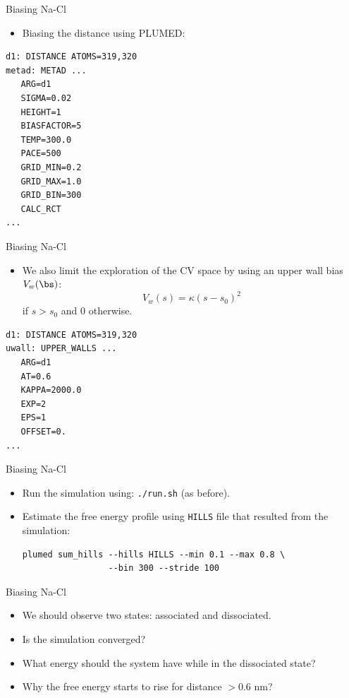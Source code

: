 \documentclass[10pt]{beamer}
\begin{document}
\begin{frame}[fragile]{Biasing Na-Cl}
\begin{itemize}
\setlength\itemsep{1em}
  \item Biasing the distance using PLUMED:
\end{itemize}
\begin{lstlisting}
d1: DISTANCE ATOMS=319,320
metad: METAD ...
   ARG=d1
   SIGMA=0.02
   HEIGHT=1
   BIASFACTOR=5
   TEMP=300.0
   PACE=500
   GRID_MIN=0.2
   GRID_MAX=1.0
   GRID_BIN=300
   CALC_RCT
...
\end{lstlisting}
\end{frame}

\begin{frame}[fragile]{Biasing Na-Cl}
\begin{itemize}
\setlength\itemsep{1em}
  \item We also limit the exploration of the CV space by using an upper wall bias $V_w(\bs)$:
  \begin{equation}
    V_w(s)=\kappa(s-s_0)^2
  \end{equation}
  if $s>s_0$ and 0 otherwise.
\end{itemize}
\begin{lstlisting}
d1: DISTANCE ATOMS=319,320
uwall: UPPER_WALLS ...
   ARG=d1
   AT=0.6
   KAPPA=2000.0
   EXP=2
   EPS=1
   OFFSET=0.
...
\end{lstlisting}
\end{frame}

\begin{frame}[fragile]{Biasing Na-Cl}
\begin{itemize}
\setlength\itemsep{1em}
  \item Run the simulation using: \texttt{./run.sh} (as before).
  \item Estimate the free energy profile using \texttt{HILLS} file that resulted from the simulation:
  \begin{lstlisting}
plumed sum_hills --hills HILLS --min 0.1 --max 0.8 \
                 --bin 300 --stride 100
  \end{lstlisting}
\end{itemize}
\end{frame}

\begin{frame}[fragile]{Biasing Na-Cl}
\begin{itemize}
\setlength\itemsep{1em}
  \item We should observe two states: associated and dissociated.

  \item Is the simulation converged?

  \item What energy should the system have while in the dissociated state?

  \item Why the free energy starts to rise for distance $>0.6$ nm?
\end{itemize}
\end{frame}
\end{document}
